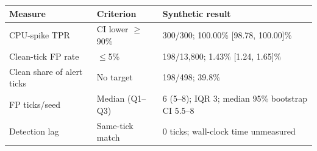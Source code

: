 \begin{tabular}{@{}p{}p{}p{}@{}}
\toprule
\textbf{Measure} & \textbf{Criterion} & \textbf{Synthetic result} \\
\midrule
CPU-spike TPR & CI lower $\geq$90\% & 300/300; 100.00\% [98.78, 100.00]\% \\
Clean-tick FP rate & $\leq$5\% & 198/13,800; 1.43\% [1.24, 1.65]\% \\
Clean share of alert ticks & No target & 198/498; 39.8\% \\
FP ticks/seed & Median (Q1--Q3) & 6 (5--8); IQR 3; median 95\% bootstrap CI 5.5--8 \\
Detection lag & Same-tick match & 0 ticks; wall-clock time unmeasured \\
\bottomrule
\end{tabular}
